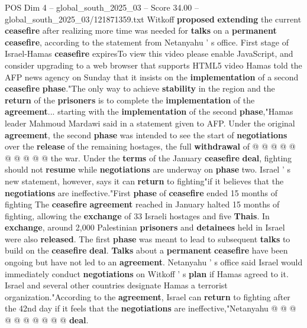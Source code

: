 \begin{textsample}{POS Dim 4 – global\_south\_2025\_03 – Score 34.00 – global\_south\_2025\_03/121871359.txt}
Witkoff \textbf{proposed} \textbf{extending} the current \textbf{ceasefire} after realizing more time was needed for \textbf{talks} on a \textbf{permanent} \textbf{ceasefire}, according to the statement from Netanyahu ' s office.
First stage of Israel-Hamas \textbf{ceasefire} expiresTo view this video please enable JavaScript, and consider upgrading to a web browser that supports HTML5 video Hamas told the AFP news agency on Sunday that it insists on the \textbf{implementation} of a second \textbf{ceasefire} \textbf{phase}."The only way to achieve \textbf{stability} in the region and the \textbf{return} of the \textbf{prisoners} is to complete the \textbf{implementation} of the \textbf{agreement}... starting with the \textbf{implementation} of the second \textbf{phase},"Hamas leader Mahmoud Mardawi said in a statement given to AFP.
Under the original \textbf{agreement}, the second \textbf{phase} was intended to see the start of \textbf{negotiations} over the \textbf{release} of the remaining hostages, the full \textbf{withdrawal} of @ @ @ @ @ @ @ @ @ @ the war.
Under the \textbf{terms} of the January \textbf{ceasefire} \textbf{deal}, fighting should not \textbf{resume} while \textbf{negotiations} are underway on \textbf{phase} two.
Israel ' s new statement, however, says it can \textbf{return} to fighting"if it believes that the \textbf{negotiations} are ineffective."First \textbf{phase} of \textbf{ceasefire} ended 15 months of fighting The \textbf{ceasefire} \textbf{agreement} reached in January halted 15 months of fighting, allowing the \textbf{exchange} of 33 Israeli hostages and five \textbf{Thais}.
In \textbf{exchange}, around 2,000 Palestinian \textbf{prisoners} and \textbf{detainees} held in Israel were also \textbf{released}.
The first \textbf{phase} was meant to lead to subsequent \textbf{talks} to build on the \textbf{ceasefire} \textbf{deal}. \textbf{Talks} about a \textbf{permanent} \textbf{ceasefire} have been ongoing but have not led to an \textbf{agreement}.
Netanyahu ' s office said Israel would immediately conduct \textbf{negotiations} on Witkoff ' s \textbf{plan} if Hamas agreed to it.
Israel and several other countries designate Hamas a terrorist organization."According to the \textbf{agreement}, Israel can \textbf{return} to fighting after the 42nd day if it feels that the \textbf{negotiations} are ineffective,"Netanyahu @ @ @ @ @ @ @ @ @ @ \textbf{deal}.

\end{textsample}
